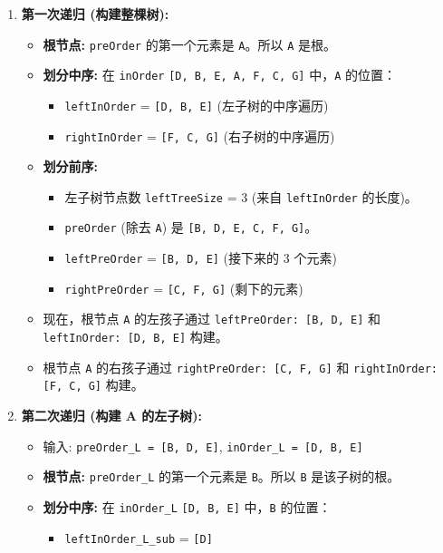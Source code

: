 \begin{enumerate}
	\item \textbf{第一次递归 (构建整棵树):}
	\begin{itemize}
		\item \textbf{根节点:} \lstinline{preOrder} 的第一个元素是 \lstinline{A}。所以 \lstinline{A} 是根。
		\item \textbf{划分中序:} 在 \lstinline{inOrder} \lstinline{[D, B, E, A, F, C, G]} 中，\lstinline{A} 的位置：
		\begin{itemize}
			\item \lstinline{leftInOrder} = \lstinline{[D, B, E]} (左子树的中序遍历)
			\item \lstinline{rightInOrder} = \lstinline{[F, C, G]} (右子树的中序遍历)
		\end{itemize}
		\item \textbf{划分前序:}
		\begin{itemize}
			\item 左子树节点数 \lstinline{leftTreeSize} = 3 (来自 \lstinline{leftInOrder} 的长度)。
			\item \lstinline{preOrder} (除去 \lstinline{A}) 是 \lstinline{[B, D, E, C, F, G]}。
			\item \lstinline{leftPreOrder} = \lstinline{[B, D, E]} (接下来的 3 个元素)
			\item \lstinline{rightPreOrder} = \lstinline{[C, F, G]} (剩下的元素)
		\end{itemize}
		\item 现在，根节点 \lstinline{A} 的左孩子通过 \lstinline{leftPreOrder: [B, D, E]} 和 \lstinline{leftInOrder: [D, B, E]} 构建。
		\item 根节点 \lstinline{A} 的右孩子通过 \lstinline{rightPreOrder: [C, F, G]} 和 \lstinline{rightInOrder: [F, C, G]} 构建。
	\end{itemize}
	\item \textbf{第二次递归 (构建 A 的左子树):}
	\begin{itemize}
		\item 输入: \lstinline{preOrder_L = [B, D, E]}, \lstinline{inOrder_L = [D, B, E]}
		\item \textbf{根节点:} \lstinline{preOrder_L} 的第一个元素是 \lstinline{B}。所以 \lstinline{B} 是该子树的根。
		\item \textbf{划分中序:} 在 \lstinline{inOrder_L} \lstinline{[D, B, E]} 中，\lstinline{B} 的位置：
		\begin{itemize}
			\item \lstinline{leftInOrder_L_sub} = \lstinline{[D]}

\end{itemize}
\end{itemize}
\end{enumerate}
